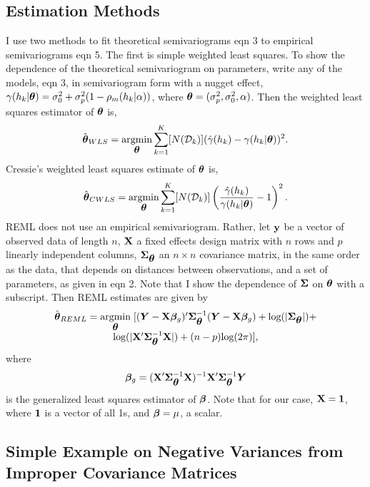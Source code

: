 \documentclass[11pt, titlepage]{article}\usepackage[]{graphicx}\usepackage[]{color}
\begin{document}
\begin{spacing}{1.9}
\subsection*{Estimation Methods}
I use two methods to fit theoretical semivariograms eqn 3 to empirical semivariograms eqn 5.  The first is simple weighted least squares.  To show the dependence of the theoretical semivariogram on parameters, write any of the models, eqn 3, in semivariogram form with a nugget effect, $\gamma(h_k|\mbox{\boldmath $\theta$}) = \sigma^2_0 + \sigma^2_p(1 - \rho_m(h_k|\alpha))$, where $\mbox{\boldmath $\theta$} = (\sigma^2_p, \sigma^2_0, \alpha)$.  Then the weighted least squares estimator of $\mbox{\boldmath $\theta$}$ is,
\[
\hat{\mbox{\boldmath $\theta$}}_{WLS} = \operatorname*{argmin}_{\mbox{\boldmath $\theta$}} \sum_{k=1}^K [N(\mathcal{D}_k)](\hat{\gamma}(h_k) - \gamma(h_k|\mbox{\boldmath $\theta$}))^2.
\]
Cressie's weighted least squares estimate of $\mbox{\boldmath $\theta$}$ is,
\[
\hat{\mbox{\boldmath $\theta$}}_{CWLS} = \operatorname*{argmin}_{\mbox{\boldmath $\theta$}} \sum_{k=1}^K [N(\mathcal{D}_k)]\left(\frac{\hat{\gamma}(h_k)}{\gamma(h_k|\mbox{\boldmath $\theta$})} - 1\right)^2.
\]
REML does not use an empirical semivariogram.  Rather, let $\mathbf{y}$ be a vector of observed data of length $n$, $\mathbf{X}$ a fixed effects design matrix with $n$ rows and $p$ linearly independent columns, $\mbox{\boldmath $\Sigma$}_{\mbox{\boldmath $\theta$}}$ an $n \times n$ covariance matrix, in the same order as the data, that depends on distances between observations, and a set of parameters, as given in eqn 2.  Note that I show the dependence of $\mbox{\boldmath $\Sigma$}$ on $\mbox{\boldmath $\theta$}$ with a subscript. Then REML estimates are given by
\begin{equation} \label{eq:REML}
	\begin{array}{c}
					\hat{\mbox{\boldmath $\theta$}}_{REML}  = \underset{\mbox{\boldmath $\theta$}}{\mathrm{argmin}} \hspace{.1cm} [(\bm Y - \mathbf{X}{\boldsymbol{\beta}}_g)^{\prime}\mbox{\boldmath $\Sigma$}_{\mbox{\boldmath $\theta$}}^{-1}(\bm Y - \mathbf{X}{\boldsymbol{\beta}}_g) + \textrm{log}(|\mbox{\boldmath $\Sigma$}_{\mbox{\boldmath $\theta$}}|) + \\
					\textrm{log}(|\mathbf{X}^{\prime}\mbox{\boldmath $\Sigma$}_{\mbox{\boldmath $\theta$}}^{-1}\mathbf{X}|) + (n-p)\textrm{log}(2\pi)],
	\end{array}
\end{equation}
where 
\begin{equation}\label{eq:betaHat}
				{\boldsymbol{\beta}}_g = (\mathbf{X}^{\prime}\mbox{\boldmath $\Sigma$}_{\mbox{\boldmath $\theta$}}^{-1}\mathbf{X})^{-1}\mathbf{X}^{\prime}\mbox{\boldmath $\Sigma$}_{\mbox{\boldmath $\theta$}}^{-1}\bm Y
\end{equation}
is the generalized least squares estimator of ${\boldsymbol{\beta}}$. Note that for our case, $\mathbf{X} = \mathbf{1}$, where $\mathbf{1}$ is a vector of all 1s, and ${\boldsymbol{\beta}} = \mu$, a scalar.

\subsection*{Simple Example on Negative Variances from Improper Covariance Matrices}


\end{spacing}
\end{document}
